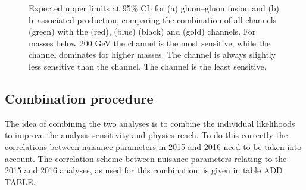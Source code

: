 \begin{figure}[h!]
\begin{center}
\end{center}
\caption{Expected upper limits at 95\% CL for (a) gluon--gluon fusion and (b) b--associated production,
comparing the combination of all channels (green) with the \mutau (red), \etau (blue) \tautau (black)
and \emu (gold) channels. For masses below 200 GeV the \mutau channel is the most sensitive,
while the \tautau channel dominates for higher masses. The \etau channel is always
slightly less sensitive than the \mutau channel. The \emu channel is the least sensitive.}
\label{fig:mssm_results_limits_breakdown_hig16006}
\end{figure}


\subsection{Combination procedure}
\label{sec:mssm_combination_procedure}
The idea of combining the two analyses is to combine the 
individual likelihoods to improve the analysis sensitivity and
physics reach. To do this correctly the correlations between
nuisance parameters in 2015 and 2016 need to be taken into account.
The correlation scheme between nuisance parameters relating to the 2015 and 2016
analyses, as used for this combination, is given in table ADD TABLE.

